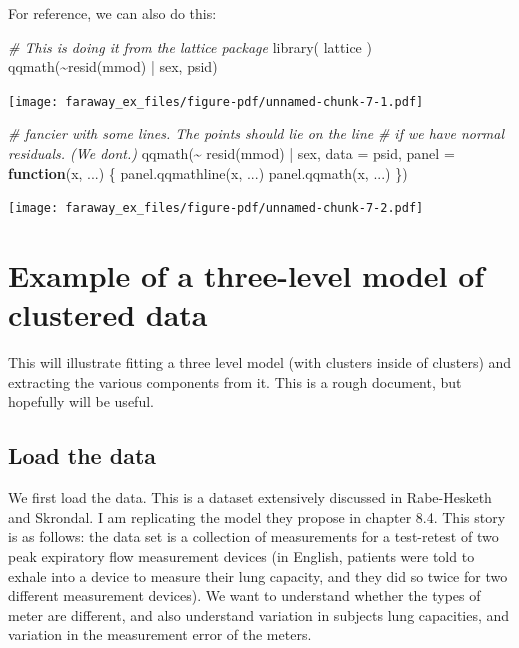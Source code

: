 \documentclass[
  letterpaper,
  DIV=11,
  numbers=noendperiod]{scrreprt}
\newenvironment{Shaded}{}{}
\newcommand{\AttributeTok}[1]{\textcolor[rgb]{0.49,0.56,0.16}{#1}}
\newcommand{\CommentTok}[1]{\textcolor[rgb]{0.38,0.63,0.69}{\textit{#1}}}
\newcommand{\ControlFlowTok}[1]{\textcolor[rgb]{0.00,0.44,0.13}{\textbf{#1}}}
\newcommand{\FunctionTok}[1]{\textcolor[rgb]{0.02,0.16,0.49}{#1}}
\newcommand{\NormalTok}[1]{#1}
\newcommand{\SpecialCharTok}[1]{\textcolor[rgb]{0.25,0.44,0.63}{#1}}
\begin{document}
For reference, we can also do this:

\begin{Shaded}
\begin{Highlighting}[]
\CommentTok{\# This is doing it from the lattice package}
\FunctionTok{library}\NormalTok{( lattice )}
\FunctionTok{qqmath}\NormalTok{(}\SpecialCharTok{\textasciitilde{}}\FunctionTok{resid}\NormalTok{(mmod) }\SpecialCharTok{|}\NormalTok{ sex, psid)}
\end{Highlighting}
\end{Shaded}

\texttt{[image: faraway\_ex\_files/figure-pdf/unnamed-chunk-7-1.pdf]}

\begin{Shaded}
\begin{Highlighting}[]
\CommentTok{\# fancier with some lines.  The points should lie on the line}
\CommentTok{\# if we have normal residuals.  (We don\textquotesingle{}t.)}
\FunctionTok{qqmath}\NormalTok{(}\SpecialCharTok{\textasciitilde{}} \FunctionTok{resid}\NormalTok{(mmod)  }\SpecialCharTok{|}\NormalTok{ sex, }\AttributeTok{data =}\NormalTok{ psid,}
       \AttributeTok{panel =} \ControlFlowTok{function}\NormalTok{(x, ...) \{}
           \FunctionTok{panel.qqmathline}\NormalTok{(x, ...)}
           \FunctionTok{panel.qqmath}\NormalTok{(x, ...)}
\NormalTok{       \})}
\end{Highlighting}
\end{Shaded}

\texttt{[image: faraway\_ex\_files/figure-pdf/unnamed-chunk-7-2.pdf]}

\chapter{Example of a three-level model of clustered
data}\label{example-of-a-three-level-model-of-clustered-data}

This will illustrate fitting a three level model (with clusters inside
of clusters) and extracting the various components from it. This is a
rough document, but hopefully will be useful.

\section{Load the data}\label{load-the-data}

We first load the data. This is a dataset extensively discussed in
Rabe-Hesketh and Skrondal. I am replicating the model they propose in
chapter 8.4. This story is as follows: the data set is a collection of
measurements for a test-retest of two peak expiratory flow measurement
devices (in English, patients were told to exhale into a device to
measure their lung capacity, and they did so twice for two different
measurement devices). We want to understand whether the types of meter
are different, and also understand variation in subjects lung
capacities, and variation in the measurement error of the meters.
\end{document}
